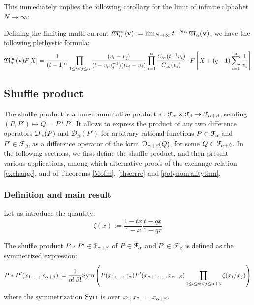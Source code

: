 This immediately implies the following corollary for the limit of infinite alphabet $N\to \infty$:
\begin{cor}
Defining the limiting multi-current ${\mathfrak M}_{\alpha}^{\infty}({\mathbf v}):=\lim_{N\to \infty} t^{-N {\alpha}}\,{\mathfrak M}_{\alpha}({\mathbf v})$, we 
have the following plethystic formula:
$$
{\mathfrak M}_{\alpha}^{\infty}({\mathbf v})F[X]=\frac{1}{(t-1)^{\alpha}}\prod_{1\leq i<j\leq {\alpha}} \frac{(v_i-v_j)}{(t -v_i v_j^{-1})(t v_i-v_j)}\prod_{i=1}^{\alpha} \frac{C_\infty(t^{-1}v_i)}{C_\infty(v_i)}\cdot  F\left[X+(q-1)\sum_{i=1}^{\alpha} \frac{1}{v_i} \right]
$$
\end{cor}

\subsection{Shuffle product}\label{shuprosec}

The shuffle product is a non-commutative product 
$*:{\mathcal F}_{\alpha} \times {\mathcal F}_\beta \to {\mathcal F}_{{\alpha}+\beta}$, sending $(P,P')\mapsto Q=P*P'$. 
It allows to express the product 
of any two difference operators ${\mathcal D}_{\alpha}(P)$ and ${\mathcal D}_\beta(P')$
for arbitrary rational functions $P\in {\mathcal F}_{\alpha} $ and $P'\in {\mathcal F}_\beta$, 
as a difference operator of the form
${\mathcal D}_{{\alpha}+\beta}(Q)$, for some $Q\in {\mathcal F}_{{\alpha}+\beta}$.
In the following sections, we first define the shuffle product, and then present various applications, among which 
alternative proofs of the exchange relation \eqref{exchange}, and of Theorems \ref{Mofm},  \ref{thserrre}
and \ref{polynomialitythm}.

\subsubsection{Definition and main result}

Let us introduce the quantity:
$$\zeta(x):=\frac{1-t x}{1-x}\frac{t-q x}{1-q x}$$

\begin{defn}\label{shufdef}
The shuffle product $P*P'\in {\mathcal F}_{{\alpha}+\beta}$ of $P\in {\mathcal F}_{\alpha} $ and $P'\in {\mathcal F}_\beta$ 
is defined as the symmetrized expression:
\begin{equation}\label{defshuf}
P*P'(x_1,...,x_{{\alpha}+\beta}):=\frac{1}{{\alpha}!\, \beta!} {\rm Sym}\left(  P(x_1,...,x_{\alpha})P'(x_{{\alpha}+1},...,x_{{\alpha}+\beta}) 
\prod_{1\leq i\leq {\alpha}<j\leq {\alpha}+\beta} 
\zeta(x_i/x_j) \right)
\end{equation}
where the symmetrization $\rm Sym$ is over $x_1,x_2,...,x_{{\alpha}+\beta}$.
\end{defn}


